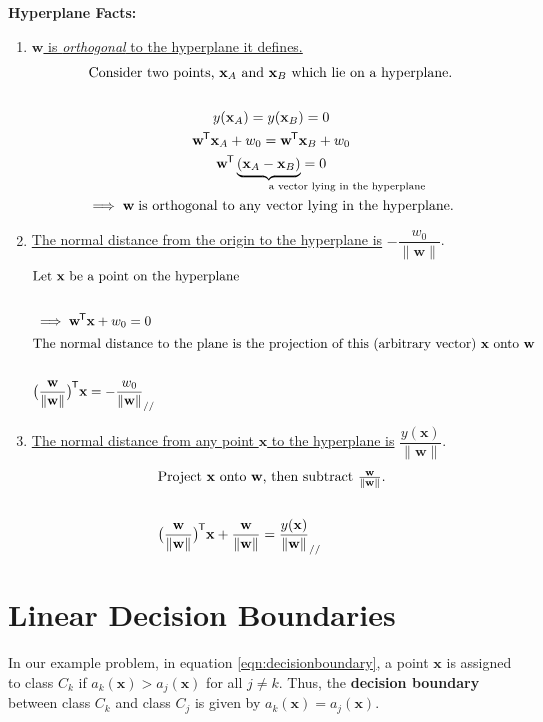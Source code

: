\documentclass[11pt]{article}
\newcommand{\xb}{\mathbf{x}}
\newcommand*{\tran}{^{\mkern-1.5mu\mathsf{T}}}
\begin{document}
\textbf{Hyperplane Facts:}
\begin{enumerate}
\item \underline{$\mathbf{w}$ is \textit{orthogonal} to the hyperplane it defines.}
\begin{gather*}
	\intertext{Consider two points, $\xb_A$ and $\xb_B$ which lie on a hyperplane.}  \\
	y(\xb_A) = y(\xb_B)  = 0 \\
	\mathbf{w}\tran \xb_A + w_0 = \mathbf{w}\tran \xb_B + w_0 \\
	\mathbf{w}\tran \underbrace{(\xb_A - \xb_B)}_{\mathrlap{\text{a vector lying in the hyperplane}}} = 0 \\
	\implies  \mathbf{w} \; \text{is orthogonal to any vector lying in the hyperplane.}
\end{gather*}

\item \underline{The normal distance from the origin to the hyperplane is} $-\dfrac{w_0}{\lVert \mathbf{w} \rVert}$.
\begin{gather*}
	\intertext{Let $\xb$ be a point on the hyperplane}  \\
	\implies \mathbf{w}\tran \xb + w_0 = 0 \\
	\intertext{The normal distance to the plane is the projection of this (arbitrary vector) $\xb$ onto $\mathbf{w}$} \\
	\bigl( \frac{\mathbf{w}}{\lVert\mathbf{w}\rVert} \bigr)\tran \xb  = - \frac{w_0}{\lVert\mathbf{w}\rVert} _{//}
\end{gather*}

\item \underline{The normal distance from any point $\xb$ to the hyperplane is} $\dfrac{y(\xb)}{\lVert \mathbf{w} \rVert}$.
\begin{gather*}
	\intertext{Project $\xb$ onto $\mathbf{w}$, then subtract $\frac{\mathbf{w}}{\lVert\mathbf{w}\rVert}$.}  \\
	\bigl( \frac{\mathbf{w}}{\lVert\mathbf{w}\rVert} \bigr)\tran \xb + \frac{\mathbf{w}}{\lVert\mathbf{w}\rVert} = \frac{y(\xb)}{\lVert\mathbf{w}\rVert}_{//}
\end{gather*}
\end{enumerate}

\section{Linear Decision Boundaries}
In our example problem, in equation \eqref{eqn:decisionboundary}, a point $\xb$ is assigned to class $C_k$ if $a_k(\xb) > a_j(\xb)$ for all $j \neq k$. Thus, the \textbf{decision boundary} between class $C_k$ and class $C_j$ is given by $a_k(\xb) = a_j(\xb)$.
\end{document}
